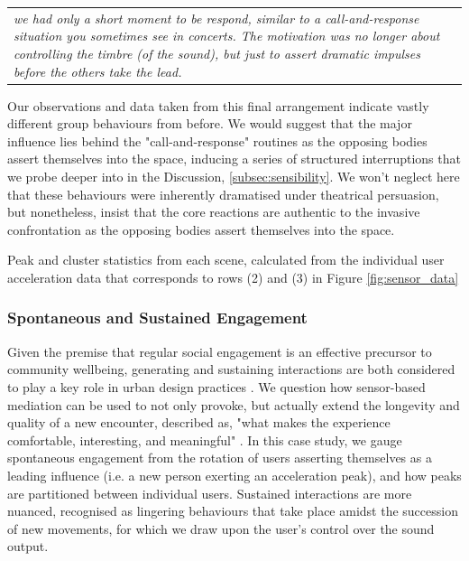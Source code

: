 \begin{center}
\begin{tabular}{ p{13cm}}
\textit{we had only a short moment to be respond, similar to a call-and-response situation you sometimes see in concerts. The motivation was no longer about controlling the timbre (of the sound), but just to assert dramatic impulses before the others take the lead.}
\end{tabular}
\end{center}

Our observations and data taken from this final arrangement indicate vastly different group behaviours from before. We would suggest that the major influence lies behind the "call-and-response" routines as the opposing bodies assert themselves into the space, inducing a series of structured interruptions that we probe deeper into in the Discussion, \ref{subsec:sensibility}. We won't neglect here that these behaviours were inherently dramatised under theatrical persuasion, but nonetheless, insist that the core reactions are authentic to the invasive confrontation as the opposing bodies assert themselves into the space.

\begin{table}[!h]

\caption[Peak and cluster statistics from each scene]{Peak and cluster statistics from each scene, calculated from the individual user acceleration data that corresponds to rows (2) and (3) in Figure \ref{fig:sensor_data}}
\label{table:cluster_table}
\end{table}

\subsubsection{Spontaneous and Sustained Engagement}

Given the premise that regular social engagement is an effective precursor to community wellbeing, generating and sustaining interactions are both considered to play a key role in urban design practices \citep{latham_social_2019,okkels_urban_2018,mehta_look_2009}. We question how sensor-based mediation can be used to not only provoke, but actually extend the longevity and quality of a new encounter, described as, "what makes the experience comfortable, interesting, and meaningful" \citep{mehta_look_2009}. In this case study, we gauge spontaneous engagement from the rotation of users asserting themselves as a leading influence (i.e. a new person exerting an acceleration peak), and how peaks are partitioned between individual users. Sustained interactions are more nuanced, recognised as lingering behaviours that take place amidst the succession of new movements, for which we draw upon the user's control over the sound output.

